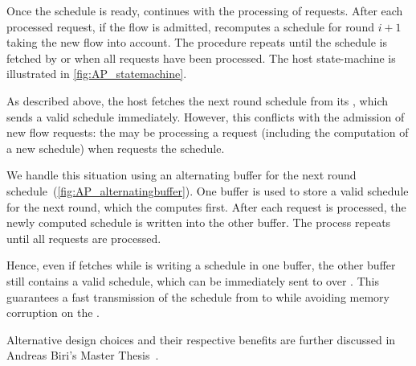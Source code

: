 Once the schedule is ready, \AP continues with the processing of \DRP requests. After each processed request, if the flow is admitted, \AP recomputes a schedule for round $i+1$ taking the new flow into account. The procedure repeats until the schedule is fetched by \CP or when all requests have been processed. The host \AP state-machine is illustrated in \cref{fig:AP_statemachine}.


As described above, the host \CP fetches the next round schedule from its \AP, which sends a valid schedule immediately.
However, this conflicts with the admission of new flow requests: the \AP may be processing a request (including the computation of a new schedule) when \CP requests the schedule.

We handle this situation using an alternating buffer for the next round schedule~(\cref{fig:AP_alternatingbuffer}). One buffer is used to store a valid schedule for the next round, which the \AP computes first. After each \DRP request is processed, the newly computed schedule is written into the other buffer. The process repeats until all requests are processed.

Hence, even if \CP fetches while \AP is writing a schedule in one buffer, the other buffer still contains a valid schedule, which can be immediately sent to \CP over \bolt.
This guarantees a fast transmission of the schedule from \AP to \CP while avoiding memory corruption on the \AP.

\begin{remark}
  Alternative design choices and their respective benefits are further discussed in Andreas Biri's Master Thesis~\cite{biri2017Unleashing}.
\end{remark}

